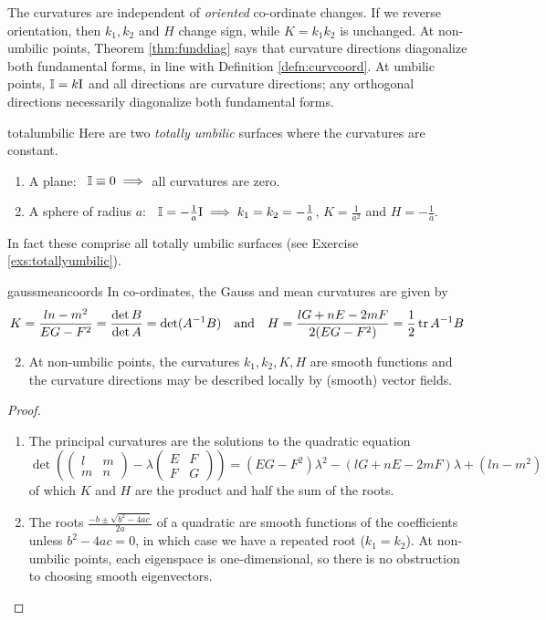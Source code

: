 
The curvatures are independent of \emph{oriented} co-ordinate changes. If we reverse orientation, then $k_1,k_2$ and $H$ change sign, while $K=k_1k_2$ is unchanged.\smallbreak
At non-umbilic points, Theorem \ref{thm:funddiag} says that curvature directions diagonalize both fundamental forms, in line with Definition \ref{defn:curvcoord}.\smallbreak
At umbilic points, $\mathbb{I}=k\mathrm{I}$ and all directions are curvature directions; any orthogonal directions necessarily diagonalize both fundamental forms. 



\begin{example}{}{totalumbilic}
	Here are two \emph{totally umbilic} surfaces where the curvatures are constant.
	\begin{enumerate}\itemsep2pt
  	\item A plane: \ $\mathbb{I}\equiv 0\implies$ all curvatures are zero.
  	\item A sphere of radius $a$: \ $\mathbb{I}=-\frac 1a\mathrm{I}\implies k_1=k_2= -\frac 1a$, $K=\frac 1{a^2}$ and $H=-\frac 1{a}$.
	\end{enumerate}
	In fact these comprise all totally umbilic surfaces (see Exercise \ref{exs:totallyumbilic}).
\end{example}


\begin{thm}{}{gaussmeancoords}
	\exstart In co-ordinates, the Gauss and mean curvatures are given by
		\[
			K=\frac{ln-m^2}{EG-F^2} =\frac{\det B}{\det A} =\det(A^{-1}B)\quad\text{and} \quad H=\frac{lG+nE-2mF}{2(EG-F^2)}  =\frac 12\operatorname{tr} A^{-1}B
		\]
	\begin{enumerate}\setcounter{enumi}{1}
	  \item At non-umbilic points, the curvatures $k_1,k_2,K,H$ are smooth functions and the curvature directions may be described locally by (smooth) vector fields.
	\end{enumerate}
\end{thm}

\begin{proof}
	\begin{enumerate}
	  \item The principal curvatures are the solutions to the quadratic equation
		\[
			\det\left(
			\begin{pmatrix}
				l&m\\m&n
			\end{pmatrix}
			-\lambda
			\begin{pmatrix}
				E&F\\
				F&G
			\end{pmatrix}
			\right) = (EG-F^2)\lambda^2-(lG+nE-2mF)\lambda+(ln-m^2)
		\]
		of which $K$ and $H$ are the product and half the sum of the roots.
	  \item The roots $\frac{-b\pm\sqrt{b^2-4ac}}{2a}$ of a quadratic are smooth functions of the coefficients unless $b^2-4ac=0$, in which case we have a repeated root ($k_1=k_2$). At non-umbilic points, each eigenspace is one-dimensional, so there is no obstruction to choosing smooth eigenvectors.\footnotemark\qedhere
	\end{enumerate}
\end{proof}

